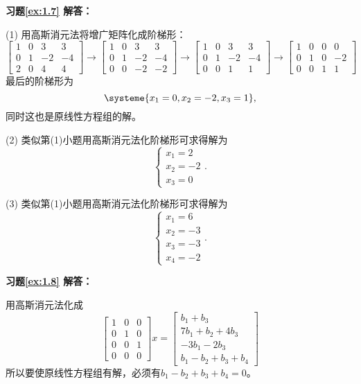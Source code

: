 \documentclass[a4paper]{book}
\newcommand{\enum}{\begin{list}{}{\setlength{\leftmargin}{0pt} \setlength{\itemindent}{2.5em} \setlength{\listparindent}{2em}}}
\begin{document}
\vspace{1.5em}

\textbf{习题\ref{ex:1.7} 解答：}

\enum
\item[(1)] 用高斯消元法将增广矩阵化成阶梯形：
$$\begin{bmatrix} 1 & 0 & 3 & 3 \\ 0 & 1 & -2 & -4 \\ 2 & 0 & 4 & 4 \end{bmatrix} \longrightarrow \begin{bmatrix} 1 & 0 & 3 & 3 \\ 0 & 1 & -2 & -4 \\ 0 & 0 & -2 & -2 \end{bmatrix}
\longrightarrow \begin{bmatrix} 1 & 0 & 3 & 3 \\ 0 & 1 & -2 & -4 \\ 0 & 0 & 1 & 1 \end{bmatrix}
\longrightarrow \begin{bmatrix} 1 & 0 & 0 & 0 \\ 0 & 1 & 0 & -2 \\ 0 & 0 & 1 & 1 \end{bmatrix}$$
最后的阶梯形为
$$\systeme{ x_1 = 0, x_2 = -2 , x_3 = 1 },$$
同时这也是原线性方程组的解。

\item[(2)] 类似第(1)小题用高斯消元法化阶梯形可求得解为
$$\begin{cases}
x_1 = 2 \\ x_2 = -2 \\ x_3 = 0
\end{cases}.$$

\item[(3)] 类似第(1)小题用高斯消元法化阶梯形可求得解为
$$\begin{cases}
x_1 = 6 \\ x_2 = -3 \\ x_3 = -3 \\ x_4 = -2
\end{cases}.$$
\end{list}

\vspace{1.5em}

\textbf{习题\ref{ex:1.8} 解答：}

用高斯消元法化成
$$\begin{bmatrix} 1 & 0 &  0 \\ 0 & 1 & 0 \\ 0 & 0 & 1 \\ 0 & 0 & 0 \end{bmatrix}x = \begin{bmatrix} b_1 + b_3 \\ 7b_1 + b_2 + 4b_3 \\ -3b_1 - 2b_3 \\ b_1 - b_2 + b_3 + b_4 \end{bmatrix}$$
所以要使原线性方程组有解，必须有$b_1 - b_2 + b_3 + b_4 = 0$。
\end{document}
